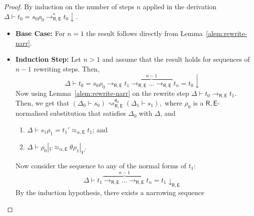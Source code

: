 \documentclass[submission,copyright,creativecommons]{eptcs}
\newcommand{\ealeq}{\approx_{\alpha,\theory{E}}}
\newcommand{\theory}[1]{\ensuremath{\mathsf{#1}}}
\theoremstyle{plain}
\theoremstyle{definition}
\theoremstyle{remark}
\begin{document}
\begin{proof}
 By induction on the number of steps $n$ applied in the derivation $\Delta \vdash t_0 = s_0\rho_0\rightarrow_{\theory{R,E}}^* t_0{\downarrow}$.

\begin{itemize}
    \item \textbf{Base Case:} For $n=1$ the result follows directly from Lemma~\ref{alem:rewrite-narr}.

    \item \textbf{Induction Step:} Let $n>1$ and assume that the result holds for sequences of  $n-1$ rewriting steps.
    Then, 
    $$\Delta \vdash t_0 = s_0\rho_0\rightarrow_{\theory{R,E}} t_1\overbrace{\rightarrow_{\theory{R,E}}\ldots \rightarrow_{\theory{R,E}}}^{n-1} t_n=t_0{\downarrow}$$
    Now using Lemma~\ref{alem:rewrite-narr} on the rewrite step $\Delta \vdash t_0 \to_{\theory{R,E}} t_1$.  Then, we get that 
    $(\Delta_{0} \vdash s_{0}) \rightsquigarrow_{\theory{R,E}}^{\theta_{0}} (\Delta_1 \vdash s_1),$
   where $\rho_0$ is a $\theory{R,E}$-normalised substitution that satisfies $\Delta_0$ with $\Delta$, and
   \begin{enumerate}[{\bf (H1)}] 
   \item  $\Delta \vdash s_1\rho_1 = t_1' \ealeq t_1$; and 
   \item $\Delta \vdash \rho_0|_V \ealeq \theta\rho_1|_V$. 
   \end{enumerate} 
   Now consider the sequence to any of the normal forms of $t_1$:
      $$\Delta \vdash  t_1\overbrace{\rightarrow_{\theory{R,E}}\ldots \rightarrow_{\theory{R,E}}}^{n-1} t_n=t_1{\downarrow_\theory{R,E}}
      $$     
    By the induction hypothesis, there exists  a narrowing sequence 


\end{itemize}
\end{proof}
\end{document}
